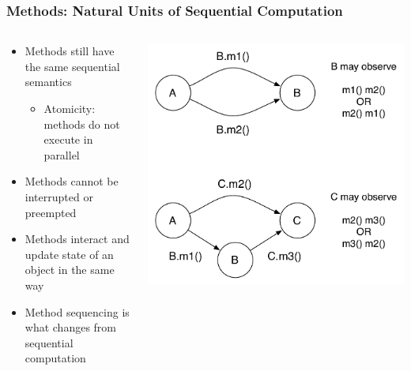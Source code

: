 \begin{frame}[fragile]
  \frametitle{Methods: Natural Units of Sequential Computation}
  \begin{columns}
    \begin{column}{0.55\textwidth}
      \begin{itemize}
      \item Methods still have the same sequential semantics
        \begin{itemize}
        \item Atomicity: methods do not execute in parallel
        \end{itemize}
      \item Methods cannot be interrupted  or preempted
      \item Methods interact and update state of an object in the same way
      \item Method sequencing is what changes from sequential computation
      \end{itemize}
    \end{column}
    \begin{column}{0.45\textwidth}
      \includegraphics[width=1\textwidth]{figures/sequencing.pdf}
    \end{column}
  \end{columns}
\end{frame}

